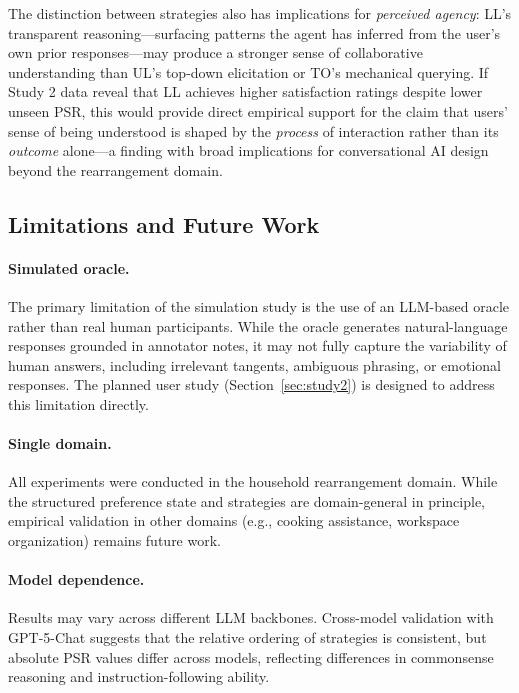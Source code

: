 \documentclass[manuscript,review,anonymous]{acmart}
\newcommand{\revend}{\color{black}}       %
\renewcommand{\revend}{}
\begin{document}
{The distinction between strategies also has implications for \textit{perceived agency}: LL's transparent reasoning---surfacing patterns the agent has inferred from the user's own prior responses---may produce a stronger sense of collaborative understanding than UL's top-down elicitation or TO's mechanical querying. If Study 2 data reveal that LL achieves higher satisfaction ratings despite lower unseen PSR, this would provide direct empirical support for the claim that users' sense of being understood is shaped by the \textit{process} of interaction rather than its \textit{outcome} alone---a finding with broad implications for conversational AI design beyond the rearrangement domain.

\subsection{Limitations and Future Work}

\paragraph{Simulated oracle.} The primary limitation of the simulation study is the use of an LLM-based oracle rather than real human participants. While the oracle generates natural-language responses grounded in annotator notes, it may not fully capture the variability of human answers, including irrelevant tangents, ambiguous phrasing, or emotional responses. The planned user study (Section~\ref{sec:study2}) is designed to address this limitation directly.

\paragraph{Single domain.} All experiments were conducted in the household rearrangement domain. While the structured preference state and strategies are domain-general in principle, empirical validation in other domains (e.g., cooking assistance, workspace organization) remains future work.

\paragraph{Model dependence.} Results may vary across different LLM backbones. Cross-model validation with GPT-5-Chat suggests that the relative ordering of strategies is consistent, but absolute PSR values differ across models, reflecting differences in commonsense reasoning and instruction-following ability.

\revend}
\end{document}
